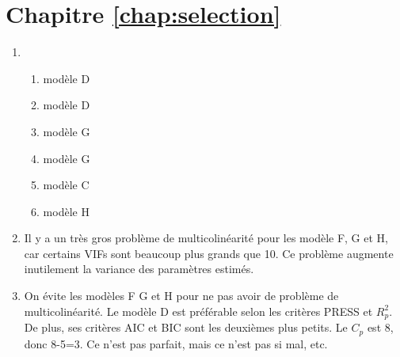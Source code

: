 \section*{Chapitre \ref{chap:selection}}

\begin{solution}{4.1}
\begin{enumerate}
\item
\begin{enumerate}
\item modèle D
\item modèle D
\item modèle G
\item modèle G
\item modèle C
\item modèle H
\end{enumerate}

\item Il y a un très gros problème de multicolinéarité pour les modèle F, G et H, car certains VIFs sont beaucoup plus grands que 10. Ce problème augmente inutilement la variance des paramètres estimés.

\item On évite les modèles F G et H pour ne pas avoir de problème de multicolinéarité. Le modèle D est préférable selon les critères PRESS et $R^2_p$. De plus, ses critères AIC et BIC sont les deuxièmes plus petits. Le $C_p$ est 8, donc 8-5=3. Ce n'est pas parfait, mais ce n'est pas si mal, etc.

\end{enumerate}
\end{solution}
